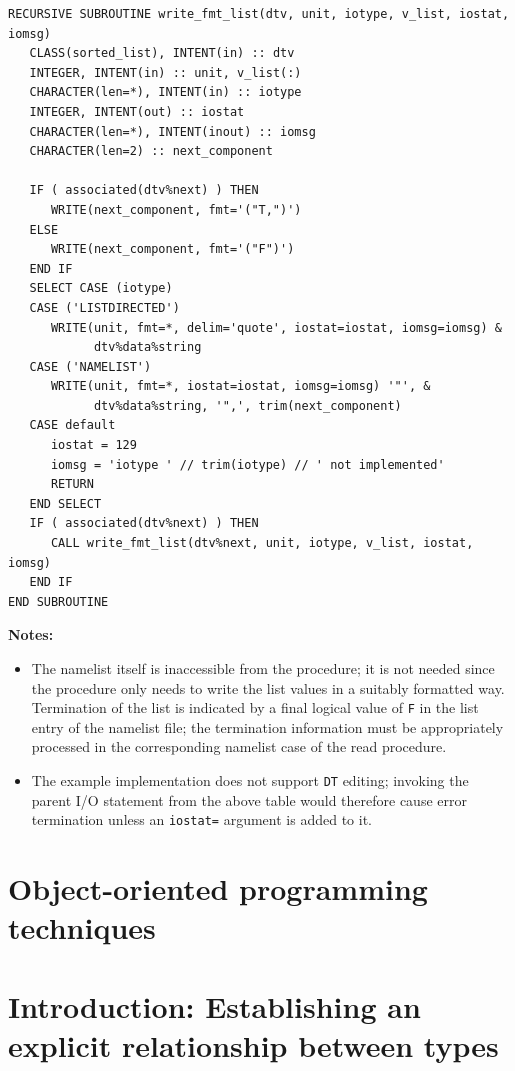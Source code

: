 \documentclass[
  paper=a4,
  ,captions=tableheading
]{scrartcl}
\newcommand{\passthrough}[1]{#1}
\providecommand{\tightlist}{%
  \setlength{\itemsep}{0pt}\setlength{\parskip}{0pt}}
\begin{document}
\begin{lstlisting}
RECURSIVE SUBROUTINE write_fmt_list(dtv, unit, iotype, v_list, iostat, iomsg)
   CLASS(sorted_list), INTENT(in) :: dtv
   INTEGER, INTENT(in) :: unit, v_list(:)
   CHARACTER(len=*), INTENT(in) :: iotype
   INTEGER, INTENT(out) :: iostat
   CHARACTER(len=*), INTENT(inout) :: iomsg
   CHARACTER(len=2) :: next_component

   IF ( associated(dtv%next) ) THEN
      WRITE(next_component, fmt='("T,")')
   ELSE
      WRITE(next_component, fmt='("F")')
   END IF
   SELECT CASE (iotype)
   CASE ('LISTDIRECTED')
      WRITE(unit, fmt=*, delim='quote', iostat=iostat, iomsg=iomsg) &
            dtv%data%string
   CASE ('NAMELIST')
      WRITE(unit, fmt=*, iostat=iostat, iomsg=iomsg) '"', &
            dtv%data%string, '",', trim(next_component)
   CASE default
      iostat = 129
      iomsg = 'iotype ' // trim(iotype) // ' not implemented'
      RETURN
   END SELECT
   IF ( associated(dtv%next) ) THEN
      CALL write_fmt_list(dtv%next, unit, iotype, v_list, iostat, iomsg)
   END IF
END SUBROUTINE
\end{lstlisting}

\textbf{Notes:}

\begin{itemize}
\tightlist
\item
  The namelist itself is inaccessible from the procedure; it is not
  needed since the procedure only needs to write the list values in a
  suitably formatted way. Termination of the list is indicated by a
  final logical value of \passthrough{\lstinline!F!} in the list entry
  of the namelist file; the termination information must be
  appropriately processed in the corresponding namelist case of the read
  procedure.
\item
  The example implementation does not support
  \passthrough{\lstinline!DT!} editing; invoking the parent I/O
  statement from the above table would therefore cause error termination
  unless an \passthrough{\lstinline!iostat=!} argument is added to it.
\end{itemize}

\section{Object-oriented programming
techniques}\label{object-oriented-programming-techniques}

\section{Introduction: Establishing an explicit relationship between
types}\label{introduction-establishing-an-explicit-relationship-between-types}
\end{document}
